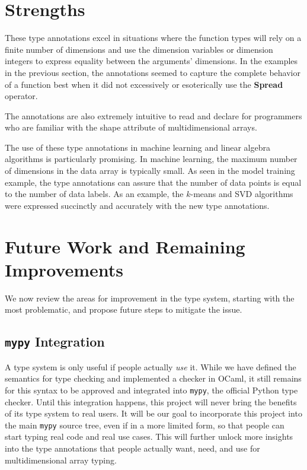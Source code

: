 \documentclass[12pt]{report}
\begin{document}
\section{Strengths}

These type annotations excel in situations where the function types will rely on a finite number of dimensions and use the dimension variables or dimension integers to express equality between the arguments' dimensions. In the examples in the previous section, the annotations seemed to capture the complete behavior of a function best when it did not excessively or esoterically use the \textbf{Spread} operator.

The annotations are also extremely intuitive to read and declare for programmers who are familiar with the shape attribute of multidimensional arrays.

The use of these type annotations in machine learning and linear algebra algorithms is particularly promising. In machine learning, the maximum number of dimensions in the data array is typically small. As seen in the model training example, the type annotations can assure that the number of data points is equal to the number of data labels. As an example, the $k$-means and SVD algorithms were expressed succinctly and accurately with the new type annotations.

\section{Future Work and Remaining Improvements}

We now review the areas for improvement in the type system, starting with the most problematic, and propose future steps to mitigate the issue.

\subsection{\texttt{mypy} Integration}

A type system is only useful if people actually \textit{use} it. While we have defined the semantics for type checking and implemented a checker in OCaml, it still remains for this syntax to be approved and integrated into \texttt{mypy}, the official Python type checker. Until this integration happens, this project will never bring the benefits of its type system to real users. It will be our goal to incorporate this project into the main \texttt{mypy} source tree, even if in a more limited form, so that people can start typing real code and real use cases. This will further unlock more insights into the type annotations that people actually want, need, and use for multidimensional array typing.
\end{document}
